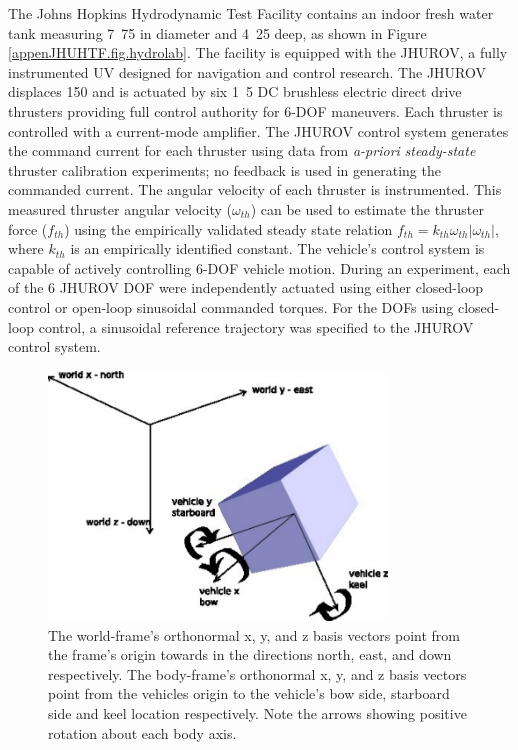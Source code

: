 The Johns Hopkins Hydrodynamic Test Facility\cite{kinsey2003}
contains an indoor fresh water tank measuring \unit{7.75}{\m} in
diameter and \unit{4.25}{\m} deep, as shown in Figure
\ref{appenJHUHTF.fig.hydrolab}.  The facility is equipped with the
\ac{JHUROV}, a fully instrumented \ac{UV} designed for navigation and
control research.  The \ac{JHUROV} displaces \unit{150}{\kg} and is
actuated by six \unit{1.5}{\kWh} DC brushless electric direct drive
thrusters providing full control authority for 6-\ac{DOF}
maneuvers. Each thruster is controlled with a current-mode amplifier.
The \ac{JHUROV} control system generates the command current for each
thruster using data from {\it a-priori} {\it steady-state} thruster
calibration experiments; no feedback is used in generating the
commanded current.  The angular velocity of each thruster is
instrumented. This measured thruster angular velocity ($\omega_{th}$)
can be used to estimate the thruster force ($f_{th}$) using the
empirically validated steady state relation
$f_{th}=k_{th}\omega_{th}|\omega_{th}|$, where $k_{th}$ is an
empirically identified constant\cite{pona.book}.
%
The vehicle's control system is capable of actively controlling
6-\ac{DOF} vehicle motion.
%
During an experiment, each of the 6 \ac{JHUROV} \ac{DOF} were
independently actuated using either closed-loop control or open-loop
sinusoidal commanded torques. 
%
For the \acp{DOF} using closed-loop control,
a sinusoidal reference trajectory was specified to the \ac{JHUROV} control
system.



\begin{center}
\begin{figure}[htbp]
  \begin{center}
    \includegraphics[width=90mm]{./appenJHUHTF/images/refFrames}
  \end{center}
  \caption{ The world-frame's orthonormal x, y, and z basis vectors
    point from the frame's origin towards in the directions north,
    east, and down respectively. The body-frame's orthonormal x, y, and
    z basis vectors point from the vehicles origin to the vehicle's
    bow side, starboard side and keel location respectively. Note the
    arrows showing positive rotation about each body axis.}
  \label{appenJHUHTF.fig.refFrames}
\end{figure}
\end{center}


